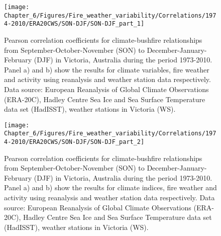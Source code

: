 \begin{figure}[h]
\noindent \begin{centering}
\texttt{[image: Chapter\_6/Figures/Fire\_weather\_variability/Correlations/1974-2010/ERA20CWS/SON-DJF/SON-DJF\_part\_1]}
\par\end{centering}

\caption[Pearson correlation coefficients for climate-bushfire relationships
from September-October-November (SON) to December-January-February
(DJF) in Victoria, Australia during the period 1973-2010]{Pearson correlation coefficients for climate-bushfire relationships
from September-October-November (SON) to December-January-February
(DJF) in Victoria, Australia during the period 1973-2010. Panel a)
and b) show the results for climate variables, fire weather and activity
using reanalysis and weather station data respectively. Data source:
European Reanalysis of Global Climate Observations (ERA-20C), Hadley
Centre Sea Ice and Sea Surface Temperature data set (HadISST), weather
stations in Victoria (WS). \label{fig:Pearson correlation coefficients for climate-bushfire relationships from September-October-November to December-January-February in Victoria, Australia during the period 1973-2010 (part 1) (r)}}
\end{figure}


\begin{figure}[h]
\noindent \begin{centering}
\texttt{[image: Chapter\_6/Figures/Fire\_weather\_variability/Correlations/1974-2010/ERA20CWS/SON-DJF/SON-DJF\_part\_2]}
\par\end{centering}

\caption[Pearson correlation coefficients for climate-bushfire relationships
from September-October-November (SON) to December-January-February
(DJF) in Victoria, Australia during the period 1973-2010]{Pearson correlation coefficients for climate-bushfire relationships
from September-October-November (SON) to December-January-February
(DJF) in Victoria, Australia during the period 1973-2010. Panel a)
and b) show the results for climate indices, fire weather and activity
using reanalysis and weather station data respectively. Data source:
European Reanalysis of Global Climate Observations (ERA-20C), Hadley
Centre Sea Ice and Sea Surface Temperature data set (HadISST), weather
stations in Victoria (WS). \label{fig:Pearson correlation coeficients for climate-bushfire relationships from September-October-November to December-January-February in Victoria, Australia during the period 1973-2010 (part 2) (r)}}
\end{figure}


